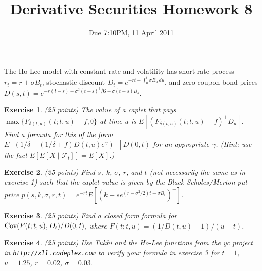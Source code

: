 \documentclass[11pt,fleqn]{amsproc}
\newcommand{\F}{\mathcal{F}}
\newcommand{\Cov}{\mathop{\rm{Cov}}}
\newtheorem{xca}{Exercise}
\begin{document}
\title{Derivative Securities Homework 8}
\author{Due 7:10PM, 11 April 2011}

\maketitle

The Ho-Lee model with constant rate and volatility has short rate
process $r_t = r + \sigma B_t$, stochastic discount
$D_t = e^{-rt - \int_0^t\sigma B_u\,du}$, and zero coupon bond prices
$D(s, t) = e^{-r(t - s) + \sigma^2(t - s)^3/6 - \sigma(t - s)B_s}$.

\begin{xca}{(25 points)}
The value of a caplet that pays
$\max\{F_{\delta(t,u)}(t;t, u) - f, 0\}$ at time $u$ 
is $E[(F_{\delta(t,u)}(t;t, u) - f)^+ D_u]$.
Find a formula for this of the form
$E[(1/\delta - (1/\delta + f)D(t, u)e^\gamma)^+]D(0, t)$
for an appropriate $\gamma$.
({\em Hint: use the fact $E[E[X\mid\F_t]] = E[X]$.})

\end{xca}

\begin{xca}{(25 points)}
Find $s$, $k$, $\sigma$, $r$, and $t$ (not necessarily the same as in
exercise 1) such that the caplet value is given by the Black-Scholes/Merton
put price $p(s, k, \sigma, r, t) = e^{-rt}E[(k - se^{(r - \sigma^2/2)t +
\sigma B_t})^+]$.

\end{xca}

\begin{xca}{(25 points)}
Find a closed form formula for $\Cov(F(t;t,u), D_t)/D(0,t)$,
where $F(t;t, u) = (1/D(t, u) - 1)/(u - t)$.
\end{xca}

\begin{xca}{(25 points)}
Use Tukhi and the Ho-Lee functions from the yc project in
{\tt http://xll.codeplex.com}
to verify your formula in exercise 3 for $t = 1$, $u = 1.25$, $r = 0.02$,
$\sigma = 0.03$.

\end{xca}
\end{document}
